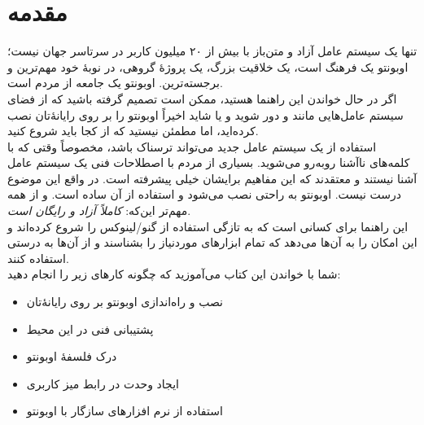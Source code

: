\chapter*{مقدمه}
\emph{} تنها یک سیستم عامل آزاد و متن‌باز  با بیش از ۲۰ میلیون کاربر در سرتاسر جهان نیست؛ اوبونتو یک فرهنگ است، یک خلاقیت بزرگ، یک پروژهٔ گروهی، در نوبهٔ خود مهم‌ترین و برجسته‌ترین. اوبونتو یک جامعه از مردم است.\\
اگر در حال خواندن این راهنما هستید، ممکن است تصمیم گرفته باشید که از فضای سیستم عامل‌هایی مانند  و  دور شوید و یا شاید اخیراً اوبونتو را بر روی رایانهٔ‌تان نصب کرده‌اید، اما مطمئن نیستید که از کجا باید شروع کنید.\\
استفاده از یک سیستم عامل جدید می‌تواند ترسناک باشد، مخصوصاً وقتی که با کلمه‌های ناآشنا روبه‌رو می‌شوید. بسیاری از مردم با اصطلاحات فنی یک سیستم عامل آشنا نیستند و معتقدند که این مفاهیم برایشان خیلی پیشرفته است. در واقع این موضوع درست نیست. اوبونتو به راحتی نصب می‌شود و استفاده از آن ساده است. و از همه مهم‌تر این‌که: \emph{کاملاً آزاد و  رایگان است}.\\

این راهنما برای کسانی است که به تازگی استفاده از گنو/لینوکس را شروع کرده‌اند و این امکان را به آن‌ها می‌دهد که تمام ابزارهای موردنیاز را بشناسند و از آن‌ها به درستی استفاده کنند.\\
شما با خواندن این کتاب می‌آموزید که چگونه کارهای زیر را انجام دهید:
\begin{itemize}
\item نصب و راه‌اندازی اوبونتو بر روی رایانه‌ٔتان
\item پشتیبانی فنی در این محیط
\item درک فلسفهٔ اوبونتو
\item ایجاد وحدت در رابط میز کاربری
\item استفاده از نرم افزارهای سازگار با اوبونتو
\end{itemize}
